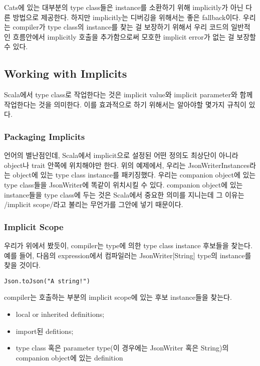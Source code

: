 \documentclass[a4paper]{article}
\begin{document}
Cats에 있는 대부분의 type class들은 instance를 소환하기 위해 implicitly가 아닌 다른 방법으로 제공한다. 하지만 implicitly는 디버깅을 위해서는 좋은 fallback이다. 우리는 compiler가 type class의 instance를 찾는 걸 보장하기 위해서 우리 코드의 일반적인 흐름안에서 implicitly 호출을 추가함으로써 모호한 implicit error가 없는 걸 보장할 수 있다.

\subsection{Working with Implicits}
\label{sec:org92f533f}
Scala에서 type class로 작업한다는 것은 implicit value와 implicit parameter와 함께 작업한다는 것을 의미한다. 이를 효과적으로 하기 위해서는 알아야할 몇가지 규칙이 있다.

\subsubsection{Packaging Implicits}
\label{sec:orgbf1cdac}
언어의 별난점인데, Scala에서 implicit으로 설정된 어떤 정의도 최상단이 아니라 object나 trait 안쪽에 위치해야만 한다. 위의 예제에서, 우리는 JsonWriterInstances라는 object에 있는 type class instance를 패키징했다. 우리는 companion object에 있는 type class들을 JsonWriter에 똑같이 위치시킬 수 있다. companion object에 있는 instance들을 type class에 두는 것은 Scala에서 중요한 의미를 지니는데 그 이유는 /implicit scope/라고 불리는 무언가를 그안에 넣기 때문이다. 

\subsubsection{Implicit Scope}
\label{sec:orgd2666d4}
우리가 위에서 봤듯이, compiler는 type에 의한 type class instance 후보들을 찾는다. 예를 들어, 다음의 expression에서 컴파일러는 JsonWriter[String] type의 instance를 찾을 것이다.

\begin{verbatim}
Json.toJson("A string!")
\end{verbatim}

compiler는 호출하는 부분의 implicit scope에 있는 후보 instance들을 찾는다.

\begin{itemize}
\item local or inherited definitions;
\item import된 defitions;
\item type class 혹은 parameter type(이 경우에는 JsonWriter 혹은 String)의 companion object에 있는 definition
\end{itemize}
\end{document}
